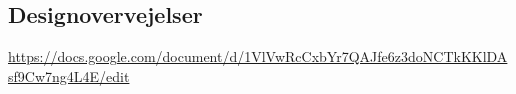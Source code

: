 \subsection{Designovervejelser}
\label{subsec:designovervejelser}





\url{https://docs.google.com/document/d/1VlVwRcCxbYr7QAJfe6z3doNCTkKKlDAsf9Cw7ng4L4E/edit}